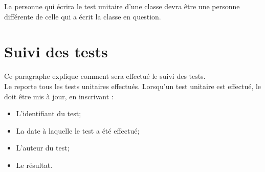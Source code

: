 	La personne qui écrira le test unitaire d'une classe devra être une personne différente de celle qui a écrit la classe en question.
	
\section{Suivi des tests}
	Ce paragraphe explique comment sera effectué le suivi des tests. \\
	
	Le \JTU{} reporte tous les tests unitaires effectués. Lorsqu'un test unitaire est effectué, le \JTU{} doit être mis à jour, en inscrivant :
	 \begin{itemize}
		\item L'identifiant du test;
		\item La date à laquelle le test a été effectué;
		\item L'auteur du test;
		\item Le résultat.
	\end{itemize}	 
